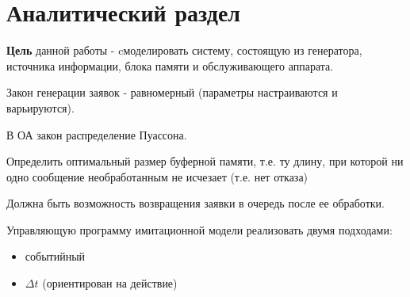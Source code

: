\chapter{Аналитический раздел}

\textbf{Цель} данной работы - cмоделировать систему, состоящую из генератора, источника информации, блока памяти и обслуживающего аппарата. 

Закон генерации заявок - равномерный (параметры настраиваются и варьируются). 

В ОА закон распределение Пуассона. 

Определить оптимальный размер буферной памяти, т.е. ту длину, при которой ни одно сообщение необработанным не исчезает (т.е. нет отказа) 

Должна быть возможность возвращения заявки в очередь после ее обработки. 

Управляющую программу имитационной модели реализовать двумя подходами:
\begin{itemize}
	\item событийный
	\item $\Delta t$ (ориентирован на действие)
\end{itemize}